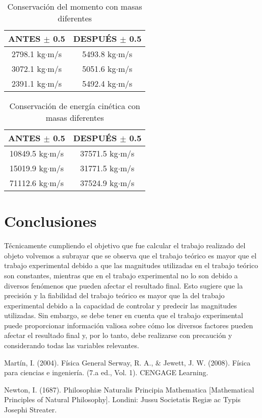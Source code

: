 \documentclass{article}
\begin{document}
\begin{table}[H]
	\centering	
	\begin{tabular}{|c|c|}
\hline
ANTES $\pm$ 0.5 & DESPUÉS $\pm$ 0.5 \\
\hline
2798.1 kg$\cdot$m/s & 5493.8 kg$\cdot$m/s \\
\hline
3072.1 kg$\cdot$m/s & 5051.6 kg$\cdot$m/s \\
\hline
2391.1 kg$\cdot$m/s & 5492.4 kg$\cdot$m/s \\
\hline
\end{tabular}
	\caption{Conservación del momento con masas diferentes}
	\label{tab:7}
\end{table}

\begin{table}[H]
	\centering	
	\begin{tabular}{|c|c|}
\hline
ANTES $\pm$ 0.5 & DESPUÉS $\pm$ 0.5 \\
\hline
10849.5 kg$\cdot$m/s & 37571.5 kg$\cdot$m/s \\
\hline
15019.9 kg$\cdot$m/s & 31771.5 kg$\cdot$m/s \\
\hline
71112.6 kg$\cdot$m/s & 37524.9 kg$\cdot$m/s \\
\hline
\end{tabular}
	\caption{Conservación de energía cinética con masas diferentes}
	\label{tab:8}
\end{table}

\section{Conclusiones}\label{Conclusiones}				%
Técnicamente cumpliendo el objetivo que fue calcular el trabajo realizado del objeto volvemos a subrayar que se observa que el trabajo teórico es mayor que el trabajo experimental debido a que las magnitudes utilizadas en el trabajo teórico son constantes, mientras que en el trabajo experimental no lo son debido a diversos fenómenos que pueden afectar el resultado final. Esto sugiere que la precisión y la fiabilidad del trabajo teórico es mayor que la del trabajo experimental debido a la capacidad de controlar y predecir las magnitudes utilizadas. Sin embargo, se debe tener en cuenta que el trabajo experimental puede proporcionar información valiosa sobre cómo los diversos factores pueden afectar el resultado final y, por lo tanto, debe realizarse con precaución y considerando todas las variables relevantes.

\begin{thebibliography}{9}						%
		Martín, I. (2004). Física General
		Serway, R. A., $\&$ Jewett, J. W. (2008). Física para ciencias e ingeniería. (7.a
ed., Vol. 1). CENGAGE Learning.

	Newton, I. (1687). Philosophiæ Naturalis Principia Mathematica [Mathematical Principles of Natural Philosophy]. Londini: Jussu Societatis Regiæ ac Typis Josephi Streater.
\end{thebibliography}
\end{document}
